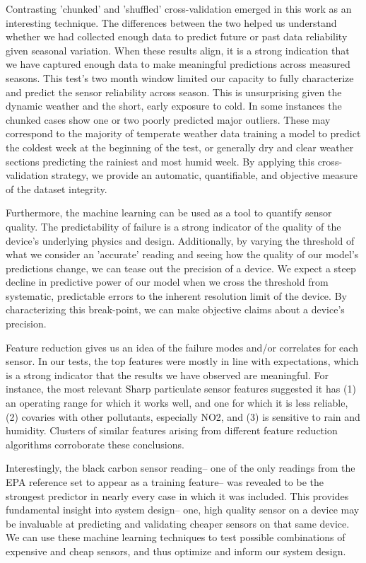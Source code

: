 Contrasting 'chunked' and 'shuffled' cross-validation emerged in this work as an interesting technique. The differences between the two helped us understand whether we had collected enough data to predict future or past data reliability given seasonal variation.  When these results align, it is a strong indication that we have captured enough data to make meaningful predictions across measured seasons.  This test's two month window limited our capacity to fully characterize and predict the sensor reliability across season.  This is unsurprising given the dynamic weather and the short, early exposure to cold.  In some instances the chunked cases show one or two poorly predicted major outliers.  These may correspond to the majority of temperate weather data training a model to predict the coldest week at the beginning of the test, or generally dry and clear weather sections predicting the rainiest and most humid week.  By applying this cross-validation strategy, we provide an automatic, quantifiable, and objective measure of the dataset integrity.

Furthermore, the machine learning can be used as a tool to quantify sensor quality.  The predictability of failure is a strong indicator of the quality of the device's underlying physics and design.  Additionally, by varying the threshold of what we consider an 'accurate' reading and seeing how the quality of our model's predictions change, we can tease out the precision of a device.  We expect a steep decline in predictive power of our model when we cross the threshold from systematic, predictable errors to the inherent resolution limit of the device.  By characterizing this break-point, we can make objective claims about a device's precision.

Feature reduction gives us an idea of the failure modes and/or correlates for each sensor.  In our tests, the top features were mostly in line with expectations, which is a strong indicator that the results we have observed are meaningful.  For instance, the most relevant Sharp particulate sensor features suggested it has (1) an operating range for which it works well, and one for which it is less reliable, (2) covaries with other pollutants, especially NO2, and (3) is sensitive to rain and humidity.  Clusters of similar features arising from different feature reduction algorithms corroborate these conclusions.
  
Interestingly, the black carbon sensor reading-- one of the only readings from the EPA reference set to appear as a training feature-- was revealed to be the strongest predictor in nearly every case in which it was included.  This provides fundamental insight into system design-- one, high quality sensor on a device may be invaluable at predicting and validating cheaper sensors on that same device.  We can use these machine learning techniques to test possible combinations of expensive and cheap sensors, and thus optimize and inform our system design.  

